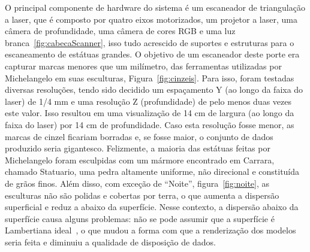 O principal componente de hardware do sistema é um escaneador de triangulação a
laser, que é composto por quatro eixos motorizados, um projetor a laser, uma
câmera de profundidade, uma câmera de cores RGB e uma luz
branca~\ref{fig:cabecaScanner}, isso tudo acrescido de suportes e estruturas
para o escaneamento de estátuas grandes. O objetivo de um escaneador deste
porte era capturar marcas menores que um milímetro, das ferramentas utilizadas
por Michelangelo em suas esculturas, Figura~\ref{fig:cinzeis}.  Para isso, foram testadas diversas
resoluções, tendo sido decidido um espaçamento Y (ao longo da faixa do
laser) de 1/4 mm e uma resolução Z (profundidade) de pelo menos duas
vezes este valor. Isso resultou em uma visualização de 14 cm de largura (ao
longo da faixa do laser) por 14 cm de profundidade. Caso esta resolução
fosse menor, as marcas de cinzel ficariam borradas e, se fosse maior, o
conjunto de dados produzido seria gigantesco.  Felizmente, a maioria das
estátuas feitas por Michelangelo foram esculpidas com um mármore encontrado em
Carrara, chamado Statuario, uma pedra altamente uniforme, não direcional e constituída
de grãos finos. Além disso, com exceção de ``Noite'', figura~\ref{fig:noite}, as
esculturas não são polidas e cobertas por terra, o que aumenta a dispersão
superficial e reduz a abaixo da superfície.  Nesse contexto, a dispersão abaixo
da superfície causa alguns problemas: não se pode assumir que a superfície é
Lambertiana ideal~\cite{basri2003lambertian}, o que mudou a forma com que a
renderização dos modelos seria feita e diminuiu a qualidade de disposição de
dados.

